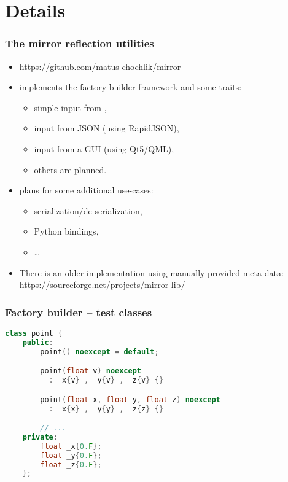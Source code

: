 \documentclass[compress,table,xcolor=table]{beamer}
\begin{document}
\section{Details}
\begin{frame}[fragile]
\frametitle{The mirror reflection utilities}
    \Large
    \begin{itemize}
        \item \url{https://github.com/matus-chochlik/mirror}
        \item implements the factory builder framework and some traits:
        \begin{itemize}
            \large
            \item simple input from \verb@iostreams@,
            \item input from JSON (using RapidJSON),
            \item input from a GUI (using Qt5/QML),
            \item others are planned.
        \end{itemize}
        \item plans for some additional use-cases:
        \begin{itemize}
            \large
            \item serialization/de-serialization,
            \item Python bindings,
            \item \ldots
        \end{itemize}
        \item There is an older implementation using manually-provided meta-data:
            \url{https://sourceforge.net/projects/mirror-lib/}
    \end{itemize}
\end{frame}
\begin{frame}[fragile]
\frametitle{Factory builder -- test classes}
    \begin{lstlisting}[language=c++]
    class point {
    public:
        point() noexcept = default;

        point(float v) noexcept
          : _x{v} , _y{v} , _z{v} {}

        point(float x, float y, float z) noexcept
          : _x{x} , _y{y} , _z{z} {}

        // ...
    private:
        float _x{0.F};
        float _y{0.F};
        float _z{0.F};
    };
    \end{lstlisting}
\end{frame}
\end{document}
